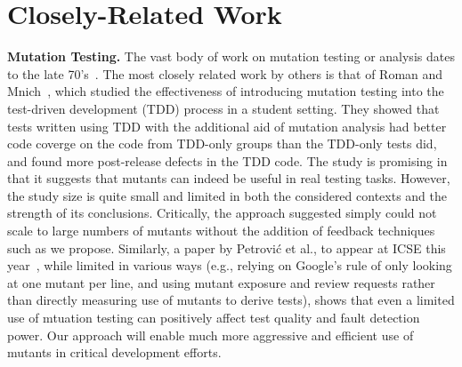 \section{Closely-Related Work}

\noindent\textbf{Mutation Testing.}
%
The vast body of work on mutation testing or analysis dates
to the late 70's~\cite{demillo1978hints,budd1980theoretical}.  
The most closely related work by others is that of Roman and
Mnich~\cite{tddmut}, which studied the effectiveness of introducing
mutation testing into the test-driven development (TDD) process in a
student setting.  They showed that tests written using TDD with the
additional aid of mutation analysis had better code coverge on the
code from TDD-only groups than the TDD-only tests did, and found more
post-release defects in the TDD code.  
The study is promising in that it suggests that mutants can indeed be
useful in real testing tasks.  However, the study size is quite small and
limited in both the considered contexts and the strength of its
conclusions.  Critically, the approach suggested simply could not scale to large
numbers of mutants without the addition of feedback techniques such
as we propose.   Similarly, a paper by Petrovi\'c et al., to appear at ICSE this
year~\cite{MutImpTest}, while limited in various ways (e.g., relying on Google's rule of only looking at one
mutant per line, and using mutant exposure and review requests rather than
directly measuring use of mutants to derive tests), 
shows that even a limited use of mtuation testing can positively affect test
quality and fault detection power. 
Our approach will enable much more aggressive and efficient use of
mutants in critical development efforts.


